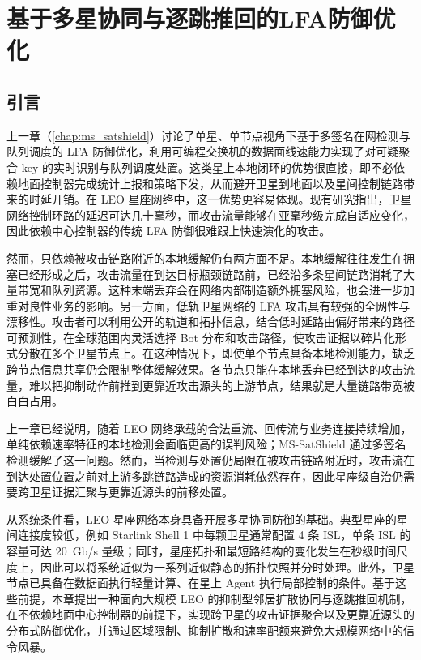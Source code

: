 \chapter{基于多星协同与逐跳推回的LFA防御优化}
\label{chap:coop_innetwork}

\section{引言}
\label{sec:ch4_intro}

上一章（\ref{chap:ms_satshield}）讨论了单星、单节点视角下基于多签名在网检测与队列调度的 LFA 防御优化，利用可编程交换机的数据面线速能力实现了对可疑聚合 key 的实时识别与队列调度处置。这类星上本地闭环的优势很直接，即不必依赖地面控制器完成统计上报和策略下发，从而避开卫星到地面以及星间控制链路带来的时延开销。在 LEO 星座网络中，这一优势更容易体现。现有研究指出，卫星网络控制环路的延迟可达几十毫秒，而攻击流量能够在亚毫秒级完成自适应变化，因此依赖中心控制器的传统 LFA 防御很难跟上快速演化的攻击。

然而，只依赖被攻击链路附近的本地缓解仍有两方面不足。本地缓解往往发生在拥塞已经形成之后，攻击流量在到达目标瓶颈链路前，已经沿多条星间链路消耗了大量带宽和队列资源。这种末端丢弃会在网络内部制造额外拥塞风险，也会进一步加重对良性业务的影响。另一方面，低轨卫星网络的 LFA 攻击具有较强的全网性与漂移性。攻击者可以利用公开的轨道和拓扑信息，结合低时延路由偏好带来的路径可预测性，在全球范围内灵活选择 Bot 分布和攻击路径，使攻击证据以碎片化形式分散在多个卫星节点上。在这种情况下，即使单个节点具备本地检测能力，缺乏跨节点信息共享仍会限制整体缓解效果。各节点只能在本地丢弃已经到达的攻击流量，难以把抑制动作前推到更靠近攻击源头的上游节点，结果就是大量链路带宽被白白占用。


上一章已经说明，随着 LEO 网络承载的合法重流、回传流与业务连接持续增加，单纯依赖速率特征的本地检测会面临更高的误判风险；MS-SatShield 通过多签名检测缓解了这一问题。然而，当检测与处置仍局限在被攻击链路附近时，攻击流在到达处置位置之前对上游多跳链路造成的资源消耗依然存在，因此星座级自治仍需要跨卫星证据汇聚与更靠近源头的前移处置。

从系统条件看，LEO 星座网络本身具备开展多星协同防御的基础。典型星座的星间连接度较低，例如 Starlink Shell 1 中每颗卫星通常配置 4 条 ISL，单条 ISL 的容量可达 20~Gb/s 量级；同时，星座拓扑和最短路结构的变化发生在秒级时间尺度上，因此可以将系统近似为一系列近似静态的拓扑快照并分时处理。此外，卫星节点已具备在数据面执行轻量计算、在星上 Agent 执行局部控制的条件。基于这些前提，本章提出一种面向大规模 LEO 的抑制型邻居扩散协同与逐跳推回机制，在不依赖地面中心控制器的前提下，实现跨卫星的攻击证据聚合以及更靠近源头的分布式防御优化，并通过区域限制、抑制扩散和速率配额来避免大规模网络中的信令风暴。

